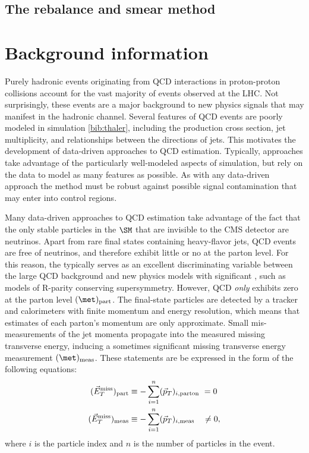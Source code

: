 \subsection{The rebalance and smear method}

\section{Background information}
Purely hadronic events originating from QCD interactions in proton-proton collisions account for the vast majority of events observed at the LHC. Not surprisingly, these events are a major background to new physics signals that may manifest in the hadronic channel. Several features of QCD events are poorly modeled in simulation \ref{bib:thaler}, including the production cross section, jet multiplicity, and relationships between the directions of jets. This motivates the development of data-driven approaches to QCD estimation. Typically, approaches take advantage of the particularly well-modeled aspects of simulation, but rely on the data to model as many features as possible. As with any data-driven approach the method must be robust against possible signal contamination that may enter into control regions. 

Many data-driven approaches to QCD estimation take advantage of the fact that the only stable particles in the $\SM$ that are invisible to the CMS detector are neutrinos. Apart from rare final states containing heavy-flavor jets,  QCD events are free of neutrinos, and therefore exhibit little or no \MET at the parton level.  For this reason, the \MET typically serves as an excellent discriminating variable between the large QCD background and new physics models with significant \MET, such as models of R-parity conserving supersymmetry. However, QCD {\it only} exhibits zero \MET at the parton level $(\met)_{\rm part}$. The final-state particles are detected by a tracker and calorimeters with finite momentum and energy resolution, which means that estimates of each parton's momentum are only approximate. Small mis-measurements of the jet momenta propagate into the measured missing transverse energy, inducing a sometimes significant missing transverse energy measurement $(\met)_{\rm meas}$.  These statements are be expressed in the form of the following equations:
\begin{align}
(\vec{E}_{ T}^{\rm miss})_{\rm part} &\equiv -\sum_{i=1}^{n}(\vec{p}_{T})_{i,\rm parton\ }=0\\
(\vec{E}_{ T}^{\rm miss})_{\rm meas} &\equiv -\sum_{i=1}^{n}(\vec{p}_{T})_{i,\rm meas\ \ \ }\neq 0,
\label{eq:metTrue}
\end{align}
where $i$ is the particle index and $n$ is the number of particles in the event.

